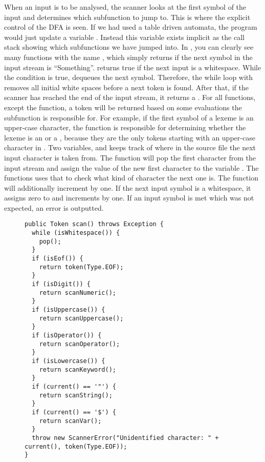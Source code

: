 When an input is to be analysed, the scanner looks at the first symbol of the input and determines which subfunction to jump to. 
This is where the explicit control of the DFA is seen. If we had used a table driven automata, the program would just update a variable . 
Instead this variable exists implicit as the call stack showing which subfunctions we have jumped into. In , you can clearly see many functions with the name , which simply returns if the next symbol in the input stream is ``Something''.  returns true if the next input is a whitespace.
While the condition is true,  dequeues the next symbol. Therefore, the while loop with  removes all initial white spaces before a next token is found. After that, if the scanner has reached the end of the input stream, it returns a . 
For all  functions, except the  function, a token will be returned based on some evaluations the subfunction is responsible for.
For example, if the first symbol of a lexeme is an upper-case character, the function  is responsible for determining whether the lexeme is an  or a , because they are the only tokens starting with an upper-case character in \productname{}. Two variables,   and   keeps track of where in the source file the next input character is taken from. The function  will pop the first character from the input stream and assign the value of the new first character to the variable . The  functions uses that  to check what kind of character the next one is.
The  function will additionally increment  by one. If the next input symbol is a whitespace, it assigns zero to   and increments  by one. If an input symbol is met which was not expected, an error is outputted.
\begin{figure}
\begin{lstlisting}
public Token scan() throws Exception {
  while (isWhitespace()) {
    pop();
  }
  if (isEof()) {
    return token(Type.EOF);
  }
  if (isDigit()) {
    return scanNumeric();
  }
  if (isUppercase()) {
    return scanUppercase();
  }
  if (isOperator()) {
    return scanOperator();
  }
  if (isLowercase()) {
    return scanKeyword();
  }
  if (current() == '"') {
    return scanString();
  }
  if (current() == '$') {
    return scanVar();
  }
  throw new ScannerError("Unidentified character: " + current(), token(Type.EOF));
}
\end{lstlisting}
\label{lst:scan}
\end{figure}
